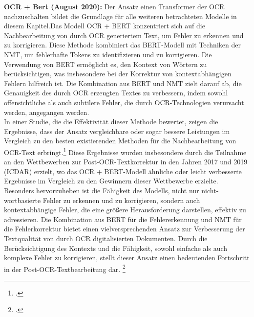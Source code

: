 \textbf{OCR + Bert (August 2020):} Der Ansatz einen Transformer der OCR nachzuschalten bildet die Grundlage für alle weiteren betrachteten Modelle in diesem Kapitel.Das Modell OCR + BERT konzentriert sich auf die Nachbearbeitung von durch OCR generiertem Text, um Fehler zu erkennen und zu korrigieren. Diese Methode kombiniert das \ac{BERT}-Modell mit Techniken der \ac{NMT}, um fehlerhafte Tokens zu identifizieren und zu korrigieren. Die Verwendung von BERT ermöglicht es, den Kontext von Wörtern zu berücksichtigen, was insbesondere bei der Korrektur von kontextabhängigen Fehlern hilfreich ist. Die Kombination aus BERT und NMT zielt darauf ab, die Genauigkeit des durch OCR erzeugten Textes zu verbessern, indem sowohl offensichtliche als auch subtilere Fehler, die durch OCR-Technologien verursacht werden, angegangen werden.\\
In einer Studie, die die Effektivität dieser Methode bewertet, zeigen die Ergebnisse, dass der Ansatz vergleichbare oder sogar bessere Leistungen im Vergleich zu den besten existierenden Methoden für die Nachbearbeitung von OCR-Text erbringt.\footcites[Vgl. dazu ausführlich]{nguyen_neural_2020} Diese Ergebnisse wurden insbesondere durch die Teilnahme an den Wettbewerben zur Post-OCR-Textkorrektur in den Jahren 2017 und 2019 (ICDAR) erzielt, wo das OCR + BERT-Modell ähnliche oder leicht verbesserte Ergebnisse im Vergleich zu den Gewinnern dieser Wettbewerbe erzielte. Besonders hervorzuheben ist die Fähigkeit des Modells, nicht nur nicht-wortbasierte Fehler zu erkennen und zu korrigieren, sondern auch kontextabhängige Fehler, die eine größere Herausforderung darstellen, effektiv zu adressieren. Die Kombination aus BERT für die Fehlererkennung und NMT für die Fehlerkorrektur bietet einen vielversprechenden Ansatz zur Verbesserung der Textqualität von durch OCR digitalisierten Dokumenten. Durch die Berücksichtigung des Kontexts und die Fähigkeit, sowohl einfache als auch komplexe Fehler zu korrigieren, stellt dieser Ansatz einen bedeutenden Fortschritt in der Post-OCR-Textbearbeitung dar. \footcites[Vgl. dazu ausführlich][S. 335 ff.]{nguyen_neural_2020}

